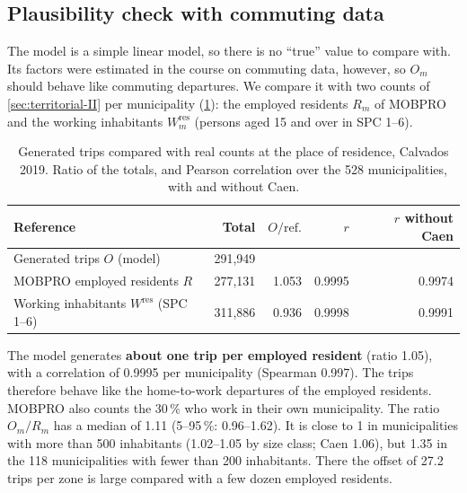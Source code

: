 \subsection{Plausibility check with commuting data}\label{sec:trip-production-plausibility}

The model is a simple linear model, so there is no ``true'' value to compare with. Its factors were estimated in the
course on commuting data, however, so $O_m$ should behave like commuting departures. We compare it with two counts of
\cref{sec:territorial-II} per municipality (\cref{tab:trips-plausibility}): the employed residents $R_m$ of
MOBPRO~\cite{insee-mobpro-2019} and the working inhabitants $W^{\mathrm{res}}_m$ (persons aged 15 and over in SPC 1--6).

\begin{table}[H]
  \centering
  \caption{Generated trips compared with real counts at the place of residence, Calvados 2019. Ratio of the totals,
  and Pearson correlation over the 528 municipalities, with and without Caen.}
  \label{tab:trips-plausibility}
  \begin{tabular}{@{}lrrrr@{}}
    \toprule
    Reference & Total & $O / \text{ref.}$ & $r$ & $r$ without Caen \\
    \midrule
    Generated trips $O$ (model) & 291{,}949 & & & \\
    MOBPRO employed residents $R$ & 277{,}131 & 1.053 & 0.9995 & 0.9974 \\
    Working inhabitants $W^{\mathrm{res}}$ (SPC 1--6) & 311{,}886 & 0.936 & 0.9998 & 0.9991 \\
    \bottomrule
  \end{tabular}
\end{table}

The model generates \textbf{about one trip per employed resident} (ratio 1.05), with a correlation of 0.9995 per
municipality (Spearman 0.997). The trips therefore behave like the home-to-work departures of the employed residents.
MOBPRO also counts the 30\,\% who work in their own municipality. The ratio $O_m / R_m$ has a median of 1.11 (5--95\,\%:
0.96--1.62). It is close to 1 in municipalities with more than 500 inhabitants (1.02--1.05 by size class; Caen 1.06),
but 1.35 in the 118 municipalities with fewer than 200 inhabitants. There the offset of 27.2 trips per zone is large
compared with a few dozen employed residents.


